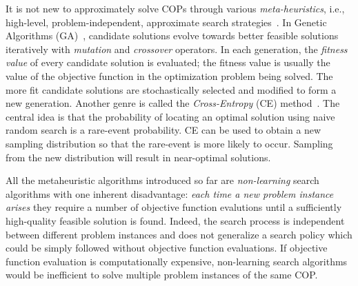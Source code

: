 It is not new to approximately solve COPs through various \textit{meta-heuristics}, i.e., high-level, problem-independent, approximate search strategies~\cite{birattari2009tuning}. In Genetic Algorithms (GA)~\cite{holland1992adaptation}, candidate solutions evolve towards better feasible solutions iteratively with \textit{mutation} and \textit{crossover} operators. In each generation, the \textit{fitness value} of every candidate solution is evaluated; the fitness value is usually the value of the objective function in the optimization problem being solved. The more fit candidate solutions are stochastically selected and modified to form a new generation. Another genre is called the \textit{Cross-Entropy} (CE) method~\cite{rubinstein1999cross}. The central idea is that the probability of locating an optimal solution using naive random search is a rare-event probability. CE can be used to obtain a new sampling distribution so that the rare-event is more likely to occur. Sampling from the new distribution will result in near-optimal solutions.

All the metaheuristic algorithms introduced so far are \textit{non-learning} search algorithms with one inherent disadvantage: \textit{each time a new problem instance arises} they require a number of objective function evalutions until a sufficiently high-quality feasible solution is found. Indeed, the search process is independent between different problem instances and does not generalize a search policy which could be simply followed without objective function evaluations. If objective function evaluation is computationally expensive, non-learning search algorithms would be inefficient to solve multiple problem instances of the same COP. 


